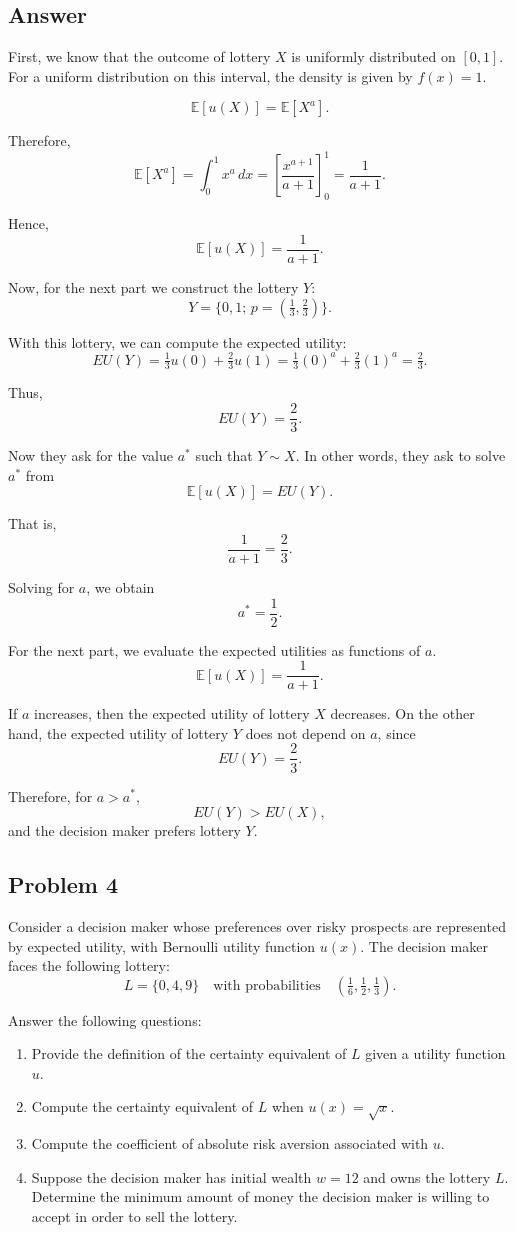 \documentclass[12pt]{article}
\begin{document}
\subsection*{Answer}
First, we know that the outcome of lottery $X$ is uniformly distributed on $[0,1]$. For a uniform distribution on this interval, the density is given by $f(x)=1$.

\[
\mathbb{E}[u(X)] = \mathbb{E}[X^{a}].
\]

Therefore,
\[
\mathbb{E}[X^{a}] = \int_{0}^{1} x^{a}\,dx
= \left[ \frac{x^{a+1}}{a+1} \right]_{0}^{1}
= \frac{1}{a+1}.
\]

Hence,
\[
\mathbb{E}[u(X)] = \frac{1}{a+1}.
\]

Now, for the next part we construct the lottery $Y$:
\[
Y = \{0,1; \, p=(\tfrac{1}{3}, \tfrac{2}{3})\}.
\]

With this lottery, we can compute the expected utility:
\[
EU(Y) = \tfrac{1}{3}u(0) + \tfrac{2}{3}u(1)
= \tfrac{1}{3}(0)^{a} + \tfrac{2}{3}(1)^{a}
= \tfrac{2}{3}.
\]

Thus,
\[
EU(Y) = \frac{2}{3}.
\]

Now they ask for the value $a^*$ such that $Y \sim X$. In other words, they ask to solve $a^*$ from
\[
\mathbb{E}[u(X)] = EU(Y).
\]

That is,
\[
\frac{1}{a+1} = \frac{2}{3}.
\]

Solving for $a$, we obtain
\[
a^* = \frac{1}{2}.
\]

For the next part, we evaluate the expected utilities as functions of $a$.
\[
\mathbb{E}[u(X)] = \frac{1}{a+1}.
\]

If $a$ increases, then the expected utility of lottery $X$ decreases. On the other hand, the expected utility of lottery $Y$ does not depend on $a$, since
\[
EU(Y) = \frac{2}{3}.
\]

Therefore, for $a>a^*$,
\[
EU(Y) > EU(X),
\]
and the decision maker prefers lottery $Y$.

\newpage

\subsection*{Problem 4}
Consider a decision maker whose preferences over risky prospects are represented by expected utility, with Bernoulli utility function $u(x)$. The decision maker faces the following lottery:
\[
L = \{0,4,9\} \quad \text{with probabilities} \quad \left(\tfrac{1}{6}, \tfrac{1}{2}, \tfrac{1}{3}\right).
\]

Answer the following questions:
\begin{enumerate}
\item Provide the definition of the certainty equivalent of $L$ given a utility function $u$.
\item Compute the certainty equivalent of $L$ when $u(x)=\sqrt{x}$.
\item Compute the coefficient of absolute risk aversion associated with $u$.
\item Suppose the decision maker has initial wealth $w=12$ and owns the lottery $L$. Determine the minimum amount of money the decision maker is willing to accept in order to sell the lottery.
\end{enumerate}
\end{document}
